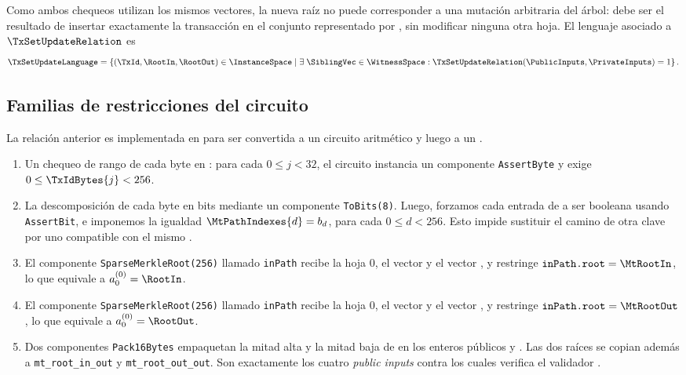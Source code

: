 Como ambos chequeos utilizan los mismos vectores, la nueva raíz \RootOut no puede corresponder a una mutación arbitraria del árbol: debe ser el resultado de insertar exactamente la transacción \TxId en el conjunto representado por \RootIn, sin modificar ninguna otra hoja. El lenguaje asociado a $\TxSetUpdateRelation$ es
$$\TxSetUpdateLanguage = \left\{(\TxId, \RootIn, \RootOut) \in \InstanceSpace \;\middle|\; \exists \; \SiblingVec \in \WitnessSpace: \TxSetUpdateRelation(\PublicInputs,\PrivateInputs)=1 \right\}.$$

\subsection{Familias de restricciones del circuito}

La relación anterior es implementada en \Circom para ser convertida a un circuito aritmético y luego a un \QAP.

\begin{enumerate}[noitemsep]
	\item Un chequeo de rango de cada byte en \TxIdBytesArray: para cada $0 \leq j < 32$, el circuito instancia un componente \texttt{AssertByte} y exige $0 \leq \TxIdBytes{j} < 256$.
	\item La descomposición de cada byte  en bits mediante un componente \texttt{ToBits(8)}. Luego, forzamos cada entrada de \MtPathIndexesArray a ser booleana usando \texttt{AssertBit}, e imponemos la igualdad $\MtPathIndexes{d} = b_d$, para cada $0 \leq d < 256$. Esto impide sustituir el camino de otra clave por uno compatible con el mismo \SiblingVec.
	\item El componente \texttt{SparseMerkleRoot(256)} llamado \texttt{inPath} recibe la hoja $0$, el vector  y el vector , y restringe $\texttt{inPath.root} = \MtRootIn$, lo que equivale a $a_0^{(0)} = \RootIn$.
	\item El componente \texttt{SparseMerkleRoot(256)} llamado \texttt{inPath} recibe la hoja $0$, el vector  y el vector , y restringe $\texttt{inPath.root} = \MtRootOut$, lo que equivale a $a_0^{(0)} = \RootOut$.
	\item Dos componentes \texttt{Pack16Bytes} empaquetan la mitad alta y la mitad baja de  en los enteros públicos \TxIdHi y \TxIdLo. Las dos raíces se copian además a \texttt{mt\_root\_in\_out} y \texttt{mt\_root\_out\_out}. Son exactamente los cuatro \textit{public inputs} contra los cuales verifica el validador \Onchain.
\end{enumerate}

